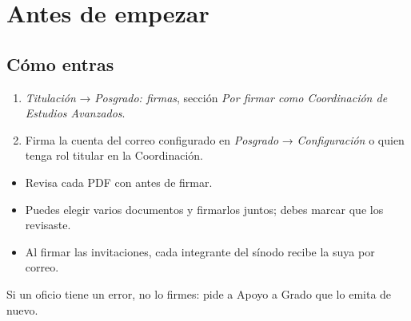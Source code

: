 \section{Antes de empezar}
\subsection*{Cómo entras}
\begin{enumerate}
  \item \emph{Titulación} → \emph{Posgrado: firmas}, sección \emph{Por firmar como Coordinación de Estudios Avanzados}.
  \item Firma la cuenta del correo configurado en \emph{Posgrado} → \emph{Configuración} o quien tenga rol titular en la Coordinación.
\end{enumerate}
\begin{tencuenta}
\begin{itemize}
  \item Revisa cada PDF con  antes de firmar.
  \item Puedes elegir varios documentos y firmarlos juntos; debes marcar que los revisaste.
  \item Al firmar las invitaciones, cada integrante del sínodo recibe la suya por correo.
\end{itemize}
\end{tencuenta}
\begin{algosalemal}
Si un oficio tiene un error, no lo firmes: pide a Apoyo a Grado que lo emita de nuevo.
\end{algosalemal}
